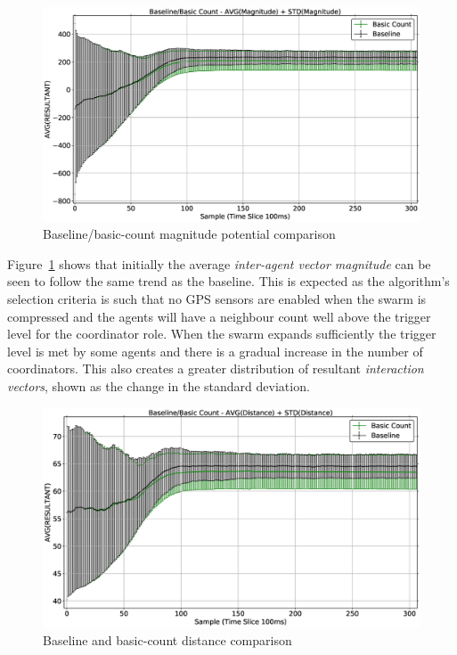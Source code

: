 \begin{figure}[H]
\begin{center}
\includegraphics[width=14cm]{CHAPTER-6/figures/BaselineBasicCountMag1}
\end{center}
\caption{Baseline/basic-count magnitude potential comparison\label{reduced:BaselineBasicCountMag1}}
\end{figure}

Figure~\ref{reduced:BaselineBasicCountMag1} shows that initially the average \textit{inter-agent vector magnitude} can be seen to follow the same trend as the baseline. This is expected as the algorithm's selection criteria is such that no GPS sensors are enabled when the swarm is compressed and the agents will have a neighbour count well above the trigger level for the coordinator role. When the swarm expands sufficiently the trigger level is met by some agents and there is a gradual increase in the number of coordinators. This also creates a greater distribution of resultant \textit{interaction vectors}, shown as the change in the standard deviation. 

\begin{figure}[H]
\begin{center}
\includegraphics[width=14cm]{CHAPTER-6/figures/BaselineBasicCountDist1}
\end{center}
\caption{Baseline and basic-count distance comparison\label{reduced:BaselineBasicCountDist1}}
\end{figure}
 
